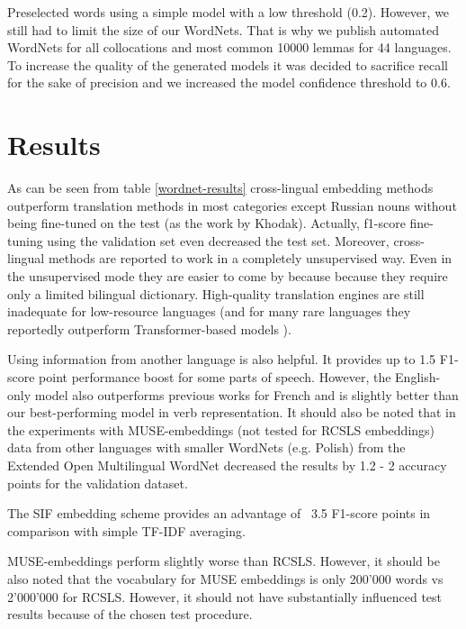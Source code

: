 \documentclass[11pt,a4paper]{article}
\begin{document}
Preselected words using a simple model with a low threshold (0.2). However, we still had to limit the size of our WordNets. That is why we publish automated WordNets for all collocations and most common 10000 lemmas for 44 languages. To increase the quality of the generated models it was decided to sacrifice recall for the sake of precision and we increased the model confidence threshold to 0.6.
\section{Results}

As can be seen from table \ref{wordnet-results} cross-lingual embedding methods outperform translation methods in most categories except Russian nouns without being fine-tuned on the test (as the work by Khodak). Actually, f1-score fine-tuning using the validation set even decreased the test set. Moreover, cross-lingual methods are reported to work in a completely unsupervised way. Even in the unsupervised mode they are easier to come by because because they require only a limited bilingual dictionary. High-quality translation engines are still inadequate for low-resource languages (and for many rare languages they reportedly outperform Transformer-based models \cite{laser}).

Using information from another language is also helpful. It provides up to 1.5 F1-score point performance boost for some parts of speech. However, the English-only model also outperforms previous works for French and is slightly better than our best-performing model in verb representation. It should also be noted that in the experiments with MUSE-embeddings (not tested for RCSLS embeddings) data from other languages with smaller WordNets (e.g. Polish) from the Extended Open Multilingual WordNet decreased the results by 1.2 - 2 accuracy points for the validation dataset.

The SIF embedding scheme provides an advantage of ~3.5 F1-score points in comparison with simple TF-IDF averaging.

MUSE-embeddings perform slightly worse than RCSLS. However, it should be also noted that the vocabulary for MUSE embeddings is only 200'000 words vs ~ 2'000'000 for RCSLS. However, it should not have substantially influenced test results because of the chosen test procedure.
\end{document}
